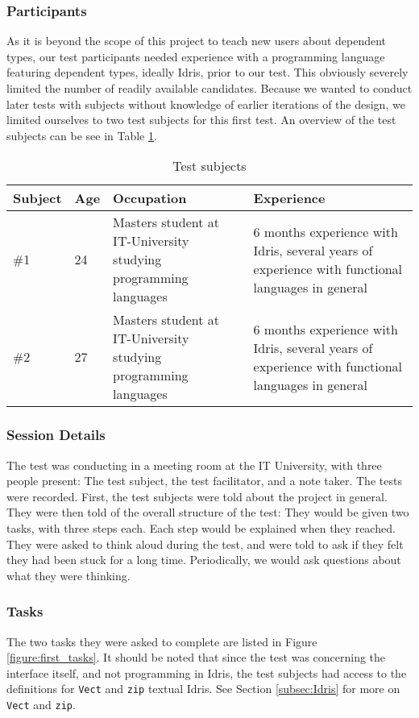 \subsubsection{Participants}
As it is beyond the scope of this project to teach new users about dependent
types, our test participants needed experience with a programming language
featuring dependent types, ideally Idris, prior to our test. This obviously
severely limited the number of readily available candidates. Because we wanted
to conduct later tests with subjects without knowledge of earlier iterations of
the design, we limited ourselves to two test subjects for this first test. An
overview of the test subjects can be see in Table \ref{table:first_test_subjects}.

\begin{table}[h]
\centering
\begin{tabular}{| l | l | p{5cm} | p{5cm} |}
\hline
Subject & Age & Occupation & Experience \\ \hline
\#1 & 24 & Masters student at IT-University studying programming languages & 6 months experience with Idris, several years of experience with functional languages in general \\ \hline
\#2 & 27 & Masters student at IT-University studying programming languages & 6 months experience with Idris, several years of experience with functional languages in general \\ \hline
\end{tabular}
\caption {Test subjects}
\label{table:first_test_subjects}
\end{table}

\subsubsection{Session Details}
The test was conducting in a meeting room at the IT University, with three
people present: The test subject, the test facilitator, and a note taker. The
tests were recorded. First, the test subjects were told about the project in
general. They were then told of the overall structure of the test: They would
be given two tasks, with three steps each. Each step would be explained when
they reached. They were asked to think aloud during the test, and were told to
ask if they felt they had been stuck for a long time. Periodically, we would
ask questions about what they were thinking.

\subsubsection{Tasks}
The two tasks they were asked to complete are listed in Figure \ref{figure:first_tasks}.
It should be noted that since the test was concerning the interface itself, and
not programming in Idris, the test subjects had access to the definitions for \texttt{Vect} and \texttt{zip} textual Idris. See Section \ref{subsec:Idris}
for more on \texttt{Vect} and \texttt{zip}.

